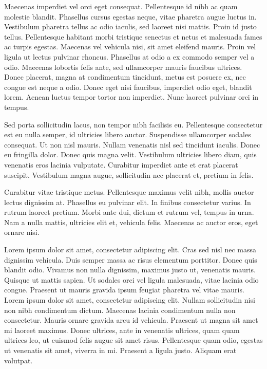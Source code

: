 \documentclass{article}
\begin{document}
 Maecenas imperdiet vel orci eget consequat. Pellentesque id nibh ac quam molestie blandit. Phasellus cursus egestas neque, vitae pharetra augue luctus in. Vestibulum pharetra tellus ac odio iaculis, sed laoreet nisi mattis. Proin id justo tellus. Pellentesque habitant morbi tristique senectus et netus et malesuada fames ac turpis egestas. Maecenas vel vehicula nisi, sit amet eleifend mauris. Proin vel ligula ut lectus pulvinar rhoncus. Phasellus at odio a ex commodo semper vel a odio. Maecenas lobortis felis ante, sed ullamcorper mauris faucibus ultrices. Donec placerat, magna at condimentum tincidunt, metus est posuere ex, nec congue est neque a odio. Donec eget nisi faucibus, imperdiet odio eget, blandit lorem. Aenean luctus tempor tortor non imperdiet. Nunc laoreet pulvinar orci in tempus. 



 Sed porta sollicitudin lacus, non tempor nibh facilisis eu. Pellentesque consectetur est eu nulla semper, id ultricies libero auctor. Suspendisse ullamcorper sodales consequat. Ut non nisl mauris. Nullam venenatis nisl sed tincidunt iaculis. Donec eu fringilla dolor. Donec quis magna velit. Vestibulum ultricies libero diam, quis venenatis eros lacinia vulputate. Curabitur imperdiet ante et erat placerat suscipit. Vestibulum magna augue, sollicitudin nec placerat et, pretium in felis. 



 Curabitur vitae tristique metus. Pellentesque maximus velit nibh, mollis auctor lectus dignissim at. Phasellus eu pulvinar elit. In finibus consectetur varius. In rutrum laoreet pretium. Morbi ante dui, dictum et rutrum vel, tempus in urna. Nam a nulla mattis, ultricies elit et, vehicula felis. Maecenas ac auctor eros, eget ornare nisi. 



 Lorem ipsum dolor sit amet, consectetur adipiscing elit. Cras sed nisl nec massa dignissim vehicula. Duis semper massa ac risus elementum porttitor. Donec quis blandit odio. Vivamus non nulla dignissim, maximus justo ut, venenatis mauris. Quisque ut mattis sapien. Ut sodales orci vel ligula malesuada, vitae lacinia odio congue. Praesent ut mauris gravida ipsum feugiat pharetra vel vitae mauris. Lorem ipsum dolor sit amet, consectetur adipiscing elit. Nullam sollicitudin nisi non nibh condimentum dictum. Maecenas lacinia condimentum nulla non consectetur. Mauris ornare gravida arcu id vehicula. Praesent ut magna sit amet mi laoreet maximus. Donec ultrices, ante in venenatis ultrices, quam quam ultrices leo, ut euismod felis augue sit amet risus. Pellentesque quam odio, egestas ut venenatis sit amet, viverra in mi. Praesent a ligula justo. Aliquam erat volutpat. 
\end{document}

